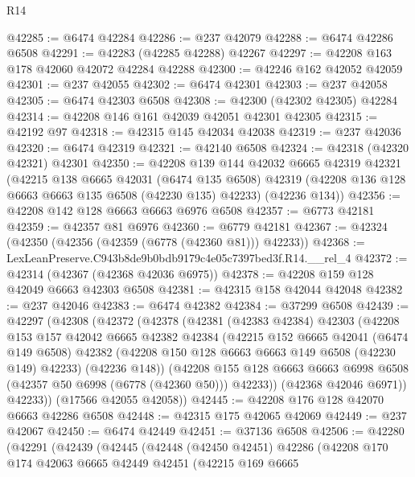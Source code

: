 \begin{lexlean}{R14}
\begin{coremodule}
@42285 := @6474 @42284
@42286 := @237 @42079
@42288 := @6474 @42286 @6508
@42291 := @42283 (@42285 @42288) @42267
@42297 := @42208 @163 @178 @42060 @42072 @42284 @42288
@42300 := @42246 @162 @42052 @42059
@42301 := @237 @42055
@42302 := @6474 @42301
@42303 := @237 @42058
@42305 := @6474 @42303 @6508
@42308 := @42300 (@42302 @42305) @42284
@42314 := @42208 @146 @161 @42039 @42051 @42301 @42305
@42315 := @42192 @97
@42318 := @42315 @145 @42034 @42038
@42319 := @237 @42036
@42320 := @6474 @42319
@42321 := @42140 @6508
@42324 := @42318 (@42320 @42321) @42301
@42350 := @42208
    @139
    @144
    @42032
    @6665
    @42319
    @42321
    (@42215
      @138
      @6665
      @42031
      (@6474 @135 @6508)
      @42319
      (@42208 @136 @128 @6663 @6663 @135 @6508 (@42230 @135) @42233)
      (@42236 @134))
@42356 := @42208 @142 @128 @6663 @6663 @6976 @6508
@42357 := @6773 @42181
@42359 := @42357 @81 @6976
@42360 := @6779 @42181
@42367 := @42324 (@42350 (@42356 (@42359 (@6778 (@42360 @81))) @42233))
@42368 := LexLeanPreserve.C943b8de9b0bdb9179c4e05c7397bed3f.R14.__rel_4
@42372 := @42314 (@42367 (@42368 @42036 @6975))
@42378 := @42208 @159 @128 @42049 @6663 @42303 @6508
@42381 := @42315 @158 @42044 @42048
@42382 := @237 @42046
@42383 := @6474 @42382
@42384 := @37299 @6508
@42439 := @42297
    (@42308
      (@42372
        (@42378
          (@42381
            (@42383 @42384)
            @42303
            (@42208
              @153
              @157
              @42042
              @6665
              @42382
              @42384
              (@42215
                @152
                @6665
                @42041
                (@6474 @149 @6508)
                @42382
                (@42208 @150 @128 @6663 @6663 @149 @6508 (@42230 @149) @42233)
                (@42236 @148))
              (@42208
                @155
                @128
                @6663
                @6663
                @6998
                @6508
                (@42357 @50 @6998 (@6778 (@42360 @50)))
                @42233))
            (@42368 @42046 @6971))
          @42233))
      (@17566 @42055 @42058))
@42445 := @42208 @176 @128 @42070 @6663 @42286 @6508
@42448 := @42315 @175 @42065 @42069
@42449 := @237 @42067
@42450 := @6474 @42449
@42451 := @37136 @6508
@42506 := @42280
    (@42291
      (@42439
        (@42445
          (@42448
            (@42450 @42451)
            @42286
            (@42208
              @170
              @174
              @42063
              @6665
              @42449
              @42451
              (@42215
                @169
                @6665

\end{coremodule}
\end{lexlean}
